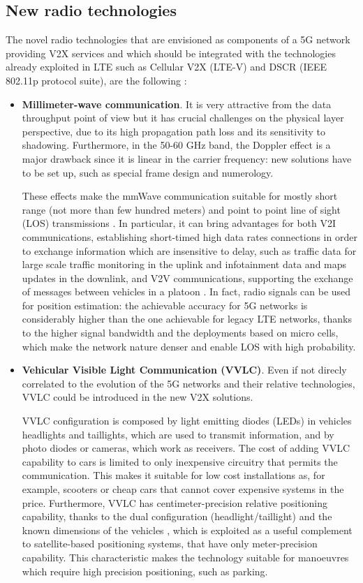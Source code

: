 \documentclass[conference,12pt,onecolumn]{IEEEtran}
\begin{document}
\subsection*{New radio technologies}
The novel radio technologies that are envisioned as components of a 5G network providing V2X services and which should be integrated with the technologies already exploited in LTE such as Cellular V2X (LTE-V) and DSCR (IEEE 802.11p protocol suite), are the following \cite{boban2017}:
\begin{itemize}
\item \textbf{Millimeter-wave communication}. It is very attractive from the data throughput point of view but it has crucial challenges on the physical layer perspective, due to its high propagation path loss and its sensitivity to shadowing. Furthermore, in the 50-60 GHz band, the Doppler effect is a major drawback since it is linear in the carrier frequency: new solutions have to be set up, such as special frame design and numerology. 

These effects make the mmWave communication suitable for mostly short range (not more than few hundred meters) and point to point line of sight (LOS) transmissions \cite{rangan2014millimeter}. In particular, it can bring advantages for both V2I communications, establishing short-timed high data rates connections in order to exchange information which are insensitive to delay, such as traffic data for large scale traffic monitoring in the uplink and infotainment data and maps updates in the downlink, and V2V communications, supporting the exchange of messages between vehicles in a platoon \cite{va2016millimeter}. In fact, radio signals can be used for position estimation: the achievable accuracy for 5G networks is considerably higher than the one achievable for legacy LTE networks, thanks to the higher signal bandwidth and the deployments based on micro cells, which make the network nature denser and enable LOS with high probability.


\item \textbf{Vehicular Visible Light Communication (VVLC)}. Even if not direcly correlated to the evolution of the 5G networks and their relative technologies, VVLC could be introduced in the new V2X solutions.

 VVLC configuration is composed by light emitting diodes (LEDs) in vehicles headlights and taillights, which are used to transmit information, and by photo diodes or cameras, which work as receivers. The cost of adding VVLC capability to cars is limited to only inexpensive circuitry that permits the communication. This makes it suitable for low cost installations as, for example, scooters or cheap cars that cannot cover expensive systems in the price. Furthermore, VVLC has centimeter-precision relative positioning capability, thanks to the dual configuration (headlight/taillight) and the known dimensions of the vehicles \cite{roberts2010}, which is exploited as a useful complement to satellite-based positioning systems, that have only meter-precision capability. This characteristic makes the technology suitable for manoeuvres which require high precision positioning, such as parking.


\end{itemize}
\end{document}
